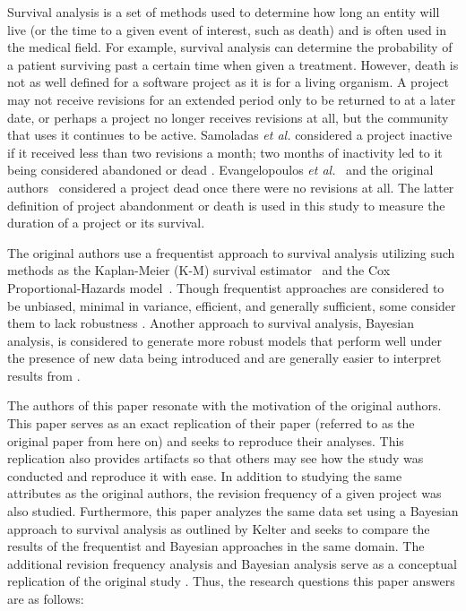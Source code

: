 \documentclass[sigconf]{acmart}
\begin{document}
Survival analysis is a set of methods used to determine how long an entity will live (or the time to a given event of interest, such as death) and is often used in the medical field.
For example, survival analysis can determine the probability of a patient surviving past a certain time when given a treatment.
However, death is not as well defined for a software project as it is for a living organism.
A project may not receive revisions for an extended period only to be returned to at a later date, or perhaps a project no longer receives revisions at all, but the community that uses it continues to be active.
Samoladas \emph{et al.} considered a project inactive if it received less than two revisions a month; two months of inactivity led to it being considered abandoned or dead \cite{samoladas2010survival}.
Evangelopoulos \emph{et al.}~\cite{evangelopoulos} and the original authors~\cite{ali2020cheating} considered a project dead once there were no revisions at all.
The latter definition of project abandonment or death is used in this study to measure the duration of a project or its survival.

The original authors use a frequentist approach to survival analysis utilizing such methods as the Kaplan-Meier (K-M) survival estimator~\cite{kaplan1958nonparametric} and the Cox Proportional-Hazards model~\cite{cox1972regression}.
Though frequentist approaches are considered to be unbiased, minimal in variance, efficient, and generally sufficient, some consider them to lack robustness \cite{renganathan2016overview}. Another approach to survival analysis, Bayesian analysis, is considered to generate more robust models that perform well under the presence of new data being introduced and are generally easier to interpret results from \cite{renganathan2016overview}.

The authors of this paper resonate with the motivation of the original authors. 
This paper serves as an exact replication \cite{shull2008role} of their paper \cite{ali2020cheating} (referred to as the original paper from here on) and seeks to reproduce their analyses. 
This replication also provides artifacts so that others may see how the study was conducted and reproduce it with ease.
In addition to studying the same attributes as the original authors, the revision frequency of a given project was also studied.
Furthermore, this paper analyzes the same data set using a Bayesian approach to survival analysis as outlined by Kelter \cite{kelter2020bayesian} and seeks to compare the results of the frequentist and Bayesian approaches in the same domain.
The additional revision frequency analysis and Bayesian analysis serve as a conceptual replication \cite{shull2008role} of the original study \cite{ali2020cheating}.
Thus, the research questions this paper answers are as follows:
\end{document}

